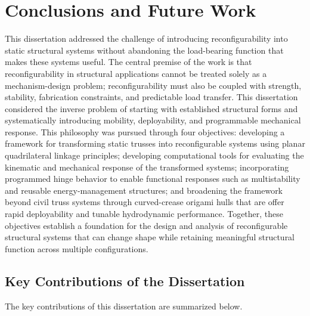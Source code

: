 \chapter{Conclusions and Future Work}\label{chapter-06}
This dissertation addressed the challenge of introducing reconfigurability into static structural systems without abandoning the load-bearing function that makes these systems useful. The central premise of the work is that reconfigurability in structural applications cannot be treated solely as a mechanism-design problem; reconfigurability must also be coupled with strength, stability, fabrication constraints, and predictable load transfer. This dissertation considered the inverse problem of starting with established structural forms and systematically introducing mobility, deployability, and programmable mechanical response. This philosophy was pursued through four objectives: developing a framework for transforming static trusses into reconfigurable systems using planar quadrilateral linkage principles; developing computational tools for evaluating the kinematic and mechanical response of the transformed systems; incorporating programmed hinge behavior to enable functional responses such as multistability and reusable energy-management structures; and broadening the framework beyond civil truss systems through curved-crease origami hulls that are offer rapid deployability and tunable hydrodynamic performance. Together, these objectives establish a foundation for the design and analysis of reconfigurable structural systems that can change shape while retaining meaningful structural function across multiple configurations.

\section{Key Contributions of the Dissertation}\label{06-sec-contributions}
The key contributions of this dissertation are summarized below.

